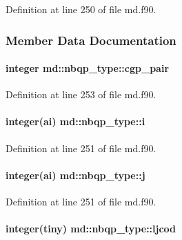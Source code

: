 Definition at line 250 of file md.\-f90.



\subsubsection{Member Data Documentation}
\hypertarget{structmd_1_1nbqp__type_a0675e7ae2cdfb5ea8f006d57609a91a5}{
\paragraph[{cgp\-\_\-pair}]{\setlength{\rightskip}{0pt plus 5cm}integer md\-::nbqp\-\_\-type\-::cgp\-\_\-pair}}\label{structmd_1_1nbqp__type_a0675e7ae2cdfb5ea8f006d57609a91a5}


Definition at line 253 of file md.\-f90.

\hypertarget{structmd_1_1nbqp__type_a4a6ed8634a13381f6cdbd1611e06819d}{
\paragraph[{i}]{\setlength{\rightskip}{0pt plus 5cm}integer(ai) md\-::nbqp\-\_\-type\-::i}}\label{structmd_1_1nbqp__type_a4a6ed8634a13381f6cdbd1611e06819d}


Definition at line 251 of file md.\-f90.

\hypertarget{structmd_1_1nbqp__type_a277900b9ea357550a707f7855b8fa1a9}{
\paragraph[{j}]{\setlength{\rightskip}{0pt plus 5cm}integer(ai) md\-::nbqp\-\_\-type\-::j}}\label{structmd_1_1nbqp__type_a277900b9ea357550a707f7855b8fa1a9}


Definition at line 251 of file md.\-f90.

\hypertarget{structmd_1_1nbqp__type_aaf42b9142e745088eb3d1fef05067b1f}{
\paragraph[{ljcod}]{\setlength{\rightskip}{0pt plus 5cm}integer(tiny) md\-::nbqp\-\_\-type\-::ljcod}}\label{structmd_1_1nbqp__type_aaf42b9142e745088eb3d1fef05067b1f}


